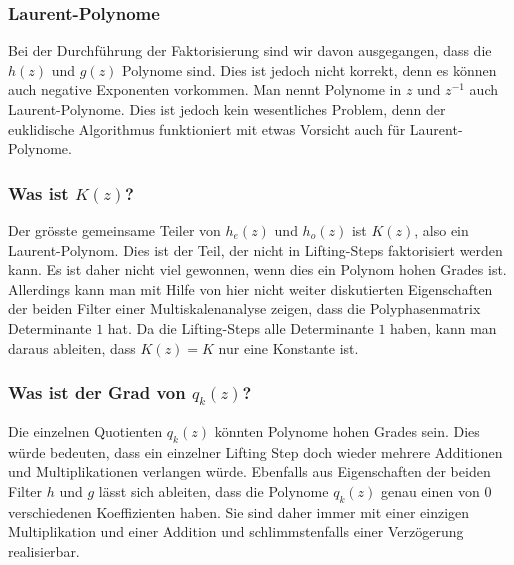 \subsubsection{Laurent-Polynome}
Bei der Durchführung der Faktorisierung sind wir davon ausgegangen,
dass die $h(z)$ und $g(z)$ Polynome sind.
Dies ist jedoch nicht korrekt, denn es können auch negative
Exponenten vorkommen.
Man nennt Polynome in $z$ und $z^{-1}$ auch Laurent-Polynome.
Dies ist jedoch kein wesentliches Problem, denn der euklidische
Algorithmus funktioniert mit etwas Vorsicht auch für Laurent-Polynome.

\subsubsection{Was ist $K(z)$?}
Der grösste gemeinsame Teiler von $h_e(z)$ und $h_o(z)$ ist $K(z)$,
also ein Laurent-Polynom.
Dies ist der Teil, der nicht in Lifting-Steps faktorisiert werden kann.
Es ist daher nicht viel gewonnen, wenn dies ein Polynom hohen Grades ist.
Allerdings kann man mit Hilfe von hier nicht weiter diskutierten
Eigenschaften der beiden Filter einer Multiskalenanalyse zeigen,
dass die Polyphasenmatrix Determinante $1$ hat.
Da die Lifting-Steps alle Determinante $1$ haben, kann man daraus
ableiten, dass $K(z)=K$ nur eine Konstante ist.

\subsubsection{Was ist der Grad von $q_k(z)$?}
Die einzelnen Quotienten $q_k(z)$ könnten Polynome hohen Grades sein.
Dies würde bedeuten, dass ein einzelner Lifting Step doch wieder
mehrere Additionen und Multiplikationen verlangen würde.
Ebenfalls aus Eigenschaften der beiden Filter $h$ und $g$ lässt
sich ableiten, dass die Polynome $q_k(z)$ genau einen
von $0$ verschiedenen Koeffizienten haben.
Sie sind daher immer mit einer einzigen Multiplikation und einer
Addition und schlimmstenfalls einer Verzögerung realisierbar.



